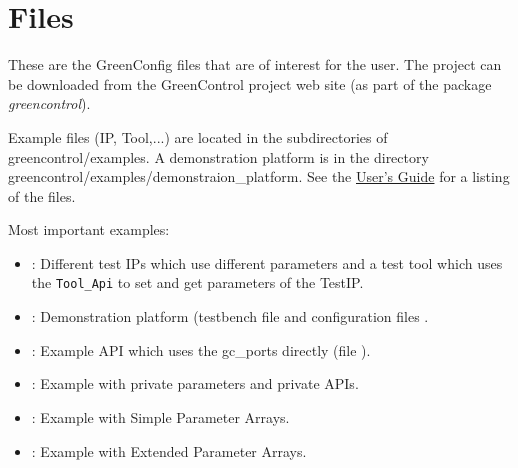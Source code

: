 \section{Files}
\label{GreenConfigFiles}
These are the GreenConfig files that are of interest for the user. The project can be downloaded from the GreenControl project web site (as part of the package \emph{greencontrol}).

Example files (IP, Tool,...) are located in the subdirectories of \mbox{\textsf{greencontrol/examples}}. A demonstration  platform is in the directory \mbox{\textsf{greencontrol/examples/demonstraion\_platform}}. See the \hyperlink{GCUsersGuide}{\GreenControl User's Guide} for a listing of the \GreenControl files.

Most important examples:
\begin{itemize}

  \item {}: \newline
  	Different test IPs which use different parameters and a test tool which uses the \GreenConfig \lstinline|Tool_Api| to set and get parameters of the TestIP.

  \item {}: \newline
  	Demonstration platform (testbench file  and configuration files .

  \item {}:  \newline
  	Example API which uses the gc\_ports directly (file ).

  \item {}:  \newline
  	Example with private parameters and private APIs.

  \item {}:  \newline
  	Example with Simple Parameter Arrays.

  \item {}:  \newline
  	Example with Extended Parameter Arrays.


\end{itemize}
